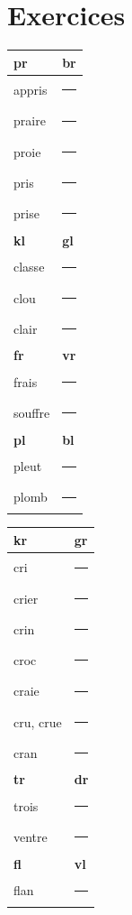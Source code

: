 \section*{Exercices}
\label{exercises-8}
\begin{center}
\small\renewcommand{\arraystretch}{1.23}
\begin{minipage}[t]{.47\linewidth}\vspace{0pt}
\begin{tabularx}{\linewidth}{|X|X|}\hline
\rowcolor{BellaPale}\textbf{pr}&\textbf{br}\\\hline
appris&\rule{16mm}{.3pt}\\
praire&\rule{16mm}{.3pt}\\
proie&\rule{16mm}{.3pt}\\
pris&\rule{16mm}{.3pt}\\
prise&\rule{16mm}{.3pt}\\\hline
\rowcolor{BellaPale}\textbf{kl}&\textbf{gl}\\\hline
classe&\rule{16mm}{.3pt}\\
clou&\rule{16mm}{.3pt}\\
clair&\rule{16mm}{.3pt}\\\hline
\rowcolor{BellaPale}\textbf{fr}&\textbf{vr}\\\hline
frais&\rule{16mm}{.3pt}\\
souffre&\rule{16mm}{.3pt}\\\hline
\rowcolor{BellaPale}\textbf{pl}&\textbf{bl}\\\hline
pleut&\rule{16mm}{.3pt}\\
plomb&\rule{16mm}{.3pt}\\\hline
\end{tabularx}
\end{minipage}\hfill
\begin{minipage}[t]{.47\linewidth}\vspace{0pt}
\begin{tabularx}{\linewidth}{|X|X|}\hline
\rowcolor{BellaPale}\textbf{kr}&\textbf{gr}\\\hline
cri&\rule{16mm}{.3pt}\\
crier&\rule{16mm}{.3pt}\\
crin&\rule{16mm}{.3pt}\\
croc&\rule{16mm}{.3pt}\\
craie&\rule{16mm}{.3pt}\\
cru, crue&\rule{16mm}{.3pt}\\
cran&\rule{16mm}{.3pt}\\\hline
\rowcolor{BellaPale}\textbf{tr}&\textbf{dr}\\\hline
trois&\rule{16mm}{.3pt}\\
ventre&\rule{16mm}{.3pt}\\\hline
\rowcolor{BellaPale}\textbf{fl}&\textbf{vl}\\\hline
flan&\rule{16mm}{.3pt}\\\hline
\end{tabularx}
\end{minipage}
\end{center}

